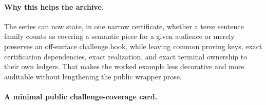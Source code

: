 \documentclass[11pt]{article}
\begin{document}
\paragraph{Why this helps the archive.}
The series can now state, in one narrow certificate, whether a terse sentence family counts as covering a semantic piece for a given audience or merely preserves an off-surface challenge hook, while leaving common proving keys, exact certification dependencies, exact realization, and exact terminal ownership to their own ledgers.
That makes the worked example less decorative and more auditable without lengthening the public wrapper prose.

\paragraph{A minimal public challenge-coverage card.}
\end{document}
